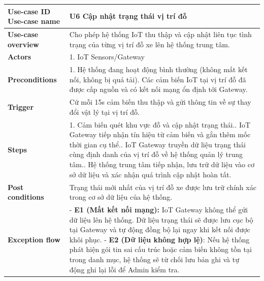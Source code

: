 
\vspace{0.5cm}
\noindent
\begin{tabularx}{\textwidth}{|>{\raggedright\arraybackslash}p{4cm}|X|}
\hline
\textbf{Use-case ID} \newline \textbf{Use-case name} & U6 \newline \textbf{Cập nhật trạng thái vị trí đỗ} \\ \hline
\textbf{Use-case overview} & Cho phép hệ thống IoT thu thập và cập nhật liên tục tình trạng của từng vị trí đỗ xe lên hệ thống trung tâm. \\ \hline
\textbf{Actors} & 1. IoT Sensors/Gateway \\ \hline
\textbf{Preconditions} & 
1. Hệ thống đang hoạt động bình thường (không mất kết nối, không bị quá tải)\newline
2. Các cảm biến IoT tại vị trí đỗ đã được cấp nguồn và có kết nối mạng ổn định tới Gateway. \\ \hline
\textbf{Trigger} & Cứ mỗi 15s cảm biến thu thập và gửi thông tin về sự thay đổi vật lý tại vị trí đỗ. \\ \hline
\textbf{Steps} & 
1. Cảm biến quét khu vực đỗ và cập nhật trạng thái.\newline
2. IoT Gateway tiếp nhận tín hiệu từ cảm biến và gắn thêm mốc thời gian cụ thể.\newline
3. IoT Gateway truyền dữ liệu trạng thái cùng định danh của vị trí đỗ về hệ thống quản lý trung tâm.\newline
4. Hệ thống trung tâm tiếp nhận, lưu trữ dữ liệu vào cơ sở dữ liệu và xác nhận quá trình cập nhật hoàn tất. \\ \hline
\textbf{Post conditions} & Trạng thái mới nhất của vị trí đỗ xe được lưu trữ chính xác trong cơ sở dữ liệu của hệ thống. \\ \hline
\textbf{Exception flow} & 
- \textbf{E1 (Mất kết nối mạng):} IoT Gateway không thể gửi dữ liệu lên hệ thống. Dữ liệu trạng thái sẽ được lưu cục bộ tại Gateway và tự động đồng bộ lại ngay khi kết nối được khôi phục. \newline 
- \textbf{E2 (Dữ liệu không hợp lệ)}: Nếu hệ thống phát hiện gói tin sai cấu trúc hoặc cảm biến không tồn tại trong danh mục, hệ thống sẽ từ chối lưu bản ghi và tự động ghi lại lỗi để Admin kiểm tra. \\ \hline
\end{tabularx}
\newpage




